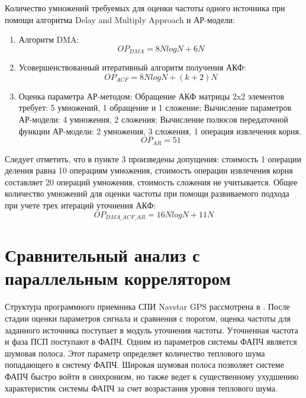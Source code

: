 Количество умножений требуемых для оценки частоты одного источника при помощи алгоритма Delay and Multiply Approach и АР-модели:
\begin{enumerate}
\item Алгоритм DMA:
	\begin{equation}
		OP_{DMA} = 8NlogN + 6N
	\end{equation}
\item Усовершенствованный итеративный алгоритм получения АКФ:
	\begin{equation}
		OP_{ACF} = 8NlogN + (k+2)N
	\end{equation}
\item Оценка параметра АР-методом:
	\subitem Обращение АКФ матрицы 2x2 элементов требует: 5 умножений, 1 обращение и 1 сложение;
	\subitem Вычисление параметров АР-модели: 4 умножения, 2 сложения;
	\subitem Вычисление полюсов передаточной функции АР-модели: 2 умножения, 3 сложения, 1 операция извлечения корня.
	\begin{equation}
		OP_{AR} = 51
	\end{equation}
\end{enumerate}

Следует отметить, что в пункте 3 произведены допущения: стоимость 1 операции деления равна 10 операциям умножения, стоимость операции извлечения
корня составляет 20 операций умножения, стоимость сложения не учитывается.
Общее количество умножений для оценки частоты при помощи развиваемого подхода при учете трех итераций уточнения АКФ:
\begin{equation}
	OP_{DMA\_ACF\_AR} = 16NlogN + 11N
\end{equation}

\section{Сравнительный анализ с параллельным коррелятором}
Структура программного приемника СПИ  Navstar GPS рассмотрена в \cite{tsui}. После стадии оценки параметров сигнала и сравнения с порогом, оценка
частоты для заданного источника поступает в модуль уточнения частоты. Уточненная частота и фаза ПСП поступают в ФАПЧ.
Одним из параметров системы ФАПЧ является шумовая полоса. Этот параметр определяет количество теплового шума попадающего в систему ФАПЧ.
Широкая шумовая полоса позволяет системе ФАПЧ быстро войти в синхронизм, но также ведет к существенному ухудшению характеристик системы ФАПЧ за счет возрастания уровня теплового шума. 

